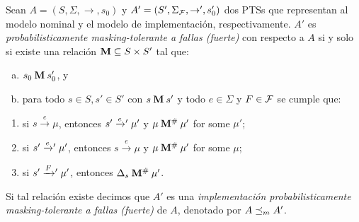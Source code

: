 \begin{definition} \label{def:masking_rel_prob}
  Sean $A =( S, \Sigma, {\rightarrow}, s_0 )$ y
  $A' =( S', \Sigma_{\mathcal{F}}, {\rightarrow'}, s_0' )$ dos PTSs que representan al modelo nominal y el modelo de implementación, respectivamente.
  $A'$ es \emph{probabilisticamente masking-tolerante a fallas (fuerte)} con respecto a $A$ si y solo si existe una relación $\mathbin{\mathbf{M}} \subseteq S \times S'$
  tal que:
  \begin{enumerate}[(a)]
  \item%
    $s_0 \mathbin{\mathbf{M}} s'_0$, y
  \item%
    para todo $s \in S, s' \in S'$ con $s \mathbin{\mathbf{M}} s'$ y todo $e \in \Sigma$
    y $F \in \mathcal{F}$ se cumple que:
  \end{enumerate}%
 \begin{enumerate}[(1)]
  \item%
    si $s \xrightarrow{e} \mu$, entonces $s' \mathrel{{\xrightarrow[]{e}}{}'} \mu'$ y
    $\mu \mathbin{\mathbf{M^{\#}}} \mu'$ for some $\mu'$;
  \item%
    si $s' \mathrel{{\xrightarrow[]{e}}{}'} \mu'$, entonces $s \xrightarrow{e} \mu$ y
    $\mu \mathbin{\mathbf{M^{\#}}} \mu'$ for some $\mu$;
  \item%
    si $s' \mathrel{{\xrightarrow[]{F}}{}'} \mu'$, entonces $\Delta_s \mathbin{\mathbf{M^{\#}}} \mu'$.
  \end{enumerate}
  Si tal relación existe decimos que $A'$ es una \emph{implementación probabilisticamente masking-tolerante a fallas (fuerte)} de $A$, 
    denotado por $A \preceq_{m} A'$.
\end{definition}

